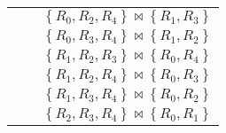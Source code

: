 \documentclass[12pt]{scrartcl}
\begin{document}
\begin{enumerate}
\begin{table}[H]
\begin{center}
\begin{tabular}{lll}
									&																				& $\left\lbrace R_{0}, R_{2}, R_{4}\right\rbrace \bowtie \left\lbrace R_{1}, R_{3}\right\rbrace $ \\
									&																				& $\left\lbrace R_{0}, R_{3}, R_{4}\right\rbrace \bowtie \left\lbrace R_{1}, R_{2}\right\rbrace $ \\
									&																				& $\left\lbrace R_{1}, R_{2}, R_{3}\right\rbrace \bowtie \left\lbrace R_{0}, R_{4}\right\rbrace $ \\
									&																				& $\left\lbrace R_{1}, R_{2}, R_{4}\right\rbrace \bowtie \left\lbrace R_{0}, R_{3}\right\rbrace $ \\ 
									&																				& $\left\lbrace R_{1}, R_{3}, R_{4}\right\rbrace \bowtie \left\lbrace R_{0}, R_{2}\right\rbrace $ \\
									&																				& $\left\lbrace R_{2}, R_{3}, R_{4}\right\rbrace \bowtie \left\lbrace R_{0}, R_{1}\right\rbrace $ \\\hline
			\end{tabular}
		\end{center}
	\end{table}


\end{enumerate}
\end{document}
